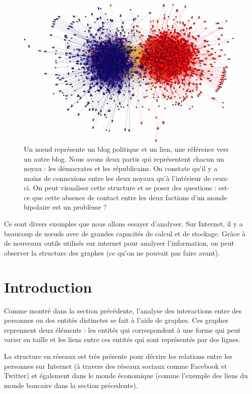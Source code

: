 \begin{figure}[!ht]
\centering
\includegraphics[width=0.65\linewidth]{images/network_structure_of_political_blogs.png}
\caption{Un n\oe ud représente un blog politique et un lien, une référence
    vers un autre blog. Nous avons deux partis qui représentent chacun
    un noyau : les démocrates et les républicains. On constate qu'il y a
    moins de connexions entre les deux noyaux qu'à l'intérieur de
    ceux-ci. On peut visualiser cette structure et se poser des
    questions : est-ce que cette absence de contact entre les deux
factions d'un monde bipolaire est un problème ?}
\end{figure}

\clearpage

Ce sont divers exemples que nous allons essayer d'analyser. Sur Internet, il y a beaucoup de nœuds avec de grandes capacités de calcul et de stockage. Grâce à de nouveaux outils utilisés sur internet pour analyser l'information, on peut observer la structure des graphes (ce qu'on ne pouvait pas faire avant).

\section{Introduction}

Comme montré dans la section précédente, l'analyse des interactions
entre des personnes ou des entités distinctes se fait à l'aide de
graphes. Ces graphes reprennent deux éléments : les entités qui
correspondent à une forme qui peut varier en taille et les liens entre
ces entités qui sont représentés par des lignes. \newline

La structure en réseaux est très présente pour décrire les relations
entre les personnes sur Internet (à travers des réseaux sociaux comme
Facebook et Twitter) et également dans le monde économique (comme
l'exemple des liens du monde bancaire dans la section précedente).
\newline

